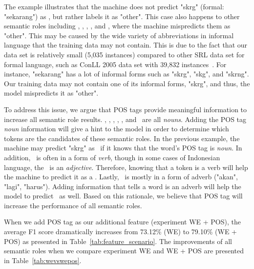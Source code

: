 The example illustrates that the machine does not predict "skrg" (formal: "sekarang") as \timesrl, but rather labels it as "other". This case also happens to other semantic roles including \agent, \patient, \beneficiary, \location, and \greet, where the machine mispredicts them as "other". This may be caused by the wide variety of abbreviations in informal language that the training data may not contain. This is due to the fact that our data set is relatively small (5,035 instances) compared to other SRL data set for formal language, such as ConLL 2005 data set with 39,832 instances~\cite{carreras2005introduction}. For instance, "sekarang" has a lot of informal forms such as "skrg", "skg", and "skrng". Our training data may not contain one of its informal forms, "skrg", and thus, the model mispredicts it as "other". 

To address this issue, we argue that POS tags provide meaningful information to increase all semantic role results. \agent, \patient, \beneficiary, \location, \greet, and \timesrl~are all \textit{nouns}. Adding the POS tag \textit{noun} information will give a hint to the model in order to determine which tokens are the candidates of these semantic roles. In the previous example, the machine may predict "skrg" as \timesrl~if it knows that the word's POS tag is \textit{noun}. In addition, \predicate~is often in a form of \textit{verb}, though in some cases of Indonesian language, the \predicate~is an \textit{adjective}. Therefore, knowing that a token is a verb will help the machine to predict it as a \predicate. Lastly, \modal~is mostly in a form of adverb ("akan", "lagi", "harus"). Adding information that tells a word is an adverb will help the model to predict \modal~as well. Based on this rationale, we believe that POS tag will increase the performance of all semantic roles.

When we add POS tag as our additional feature (experiment WE + POS), the average F1 score dramatically increases from 73.12\% (WE) to 79.10\% (WE + POS) as presented in Table~\ref{tab:feature_scenario}. The improvements of all semantic roles when we compare experiment WE and WE + POS are presented in Table~\ref{tab:wevswepos}.

